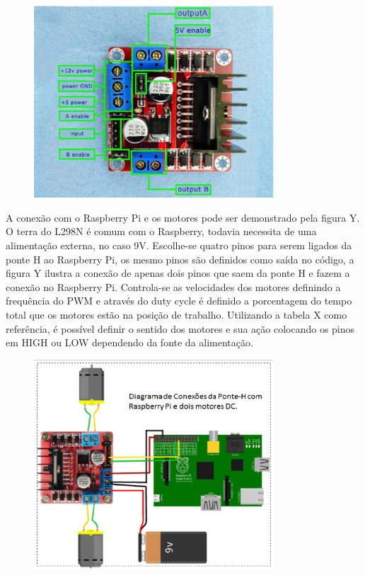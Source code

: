 \begin{figure}[H]
    \centering
    \includegraphics[width=0.8\textwidth]{figuras/ponteH.eps}
    \caption{}
    \label{fig:catia01}
\end{figure}

A conexão com o Raspberry Pi e os motores pode ser demonstrado pela figura Y. O terra do L298N é comum com o Raspberry, todavia necessita de uma alimentação externa, no caso 9V. Escolhe-se quatro pinos para serem ligados da ponte H ao Raspberry Pi, os mesmo pinos são definidos como saída no código, a figura Y ilustra a conexão de apenas dois pinos que saem da ponte H e fazem a conexão no Raspberry Pi. Controla-se as velocidades dos motores definindo a frequência do PWM e através do duty cycle é definido a porcentagem do tempo total que os motores estão na posição de trabalho. Utilizando a tabela X como referência, é possível definir o sentido dos motores e sua ação colocando os pinos em HIGH ou LOW  dependendo da fonte da alimentação. 

\begin{figure}[H]
    \centering
    \includegraphics[width=0.8\textwidth]{figuras/esquematico_componentes.eps}
    \caption{}
    \label{fig:catia01}
\end{figure}

